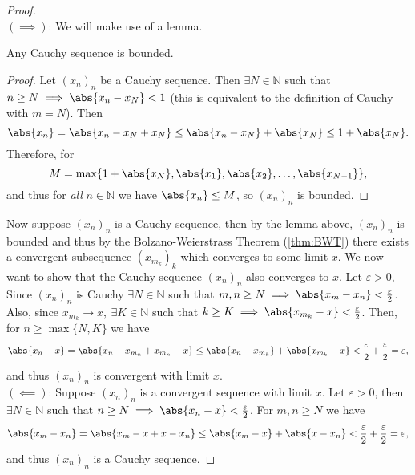 \documentclass[../real_analysis.tex]{subfiles}
\begin{document}
            \begin{proof}\\
                $(\implies)$: We will make use of a lemma.
                \begin{lemma}
                    Any Cauchy sequence is bounded.
                \end{lemma}
                \begin{proof}
                    Let $(x_n)_n$ be a Cauchy sequence. Then $\exists N\in\mathbb{N}$ such that $n\geq N\implies\abs{x_n-x_N}<1$ (this is equivalent to the definition of Cauchy with $m=N$). Then
                    \begin{equation}
                        \abs{x_n}=\abs{x_n-x_N+x_N}\leq\abs{x_n-x_N}+\abs{x_N}\leq 1+\abs{x_N}.
                    \end{equation}
                    Therefore, for
                    \begin{equation}
                        M=\max\{1+\abs{x_N},\abs{x_1},\abs{x_2},\dots,\abs{x_{N-1}}\},
                    \end{equation}
                    and thus for \textit{all} $n\in\mathbb{N}$ we have $\abs{x_n}\leq M$, so $(x_n)_n$ is bounded.
                \end{proof}
                Now suppose $(x_n)_n$ is a Cauchy sequence, then by the lemma above, $(x_n)_n$ is bounded and thus by the Bolzano-Weierstrass Theorem (\ref{thm:BWT}) there exists a convergent subsequence $(x_{m_k})_k$ which converges to some limit $x$. We now want to show that the Cauchy sequence $(x_n)_n$ also converges to $x$. Let $\varepsilon>0$, Since $(x_n)_n$ is Cauchy $\exists N\in\mathbb{N}$ such that $m,n\geq N\implies\abs{x_m-x_n}<\frac{\varepsilon}{2}$. Also, since $x_{m_k}\to x,\ \exists K\in\mathbb{N}$ such that $k\geq K\implies\abs{x_{m_k}-x}<\frac{\varepsilon}{2}$. Then, for $n\geq\max\{N,K\}$ we have
                \begin{equation}
                    \abs{x_n-x}=\abs{x_n-x_{m_n}+x_{m_n}-x}\leq\abs{x_n-x_{m_k}}+\abs{x_{m_k}-x}<\frac{\varepsilon}{2}+\frac{\varepsilon}{2}=\varepsilon,
                \end{equation}
                and thus $(x_n)_n$ is convergent with limit $x$.\\
                $(\impliedby)$: Suppose $(x_n)_n$ is a convergent sequence with limit $x$. Let $\varepsilon>0$, then $\exists N\in\mathbb{N}$ such that $n\geq N\implies\abs{x_n-x}<\frac{\varepsilon}{2}$. For $m,n\geq N$ we have
                \begin{equation}
                    \abs{x_m-x_n}=\abs{x_m-x+x-x_n}\leq\abs{x_m-x}+\abs{x-x_n}<\frac{\varepsilon}{2}+\frac{\varepsilon}{2}=\varepsilon,
                \end{equation}
                and thus $(x_n)_n$ is a Cauchy sequence.
            \end{proof}
\end{document}
